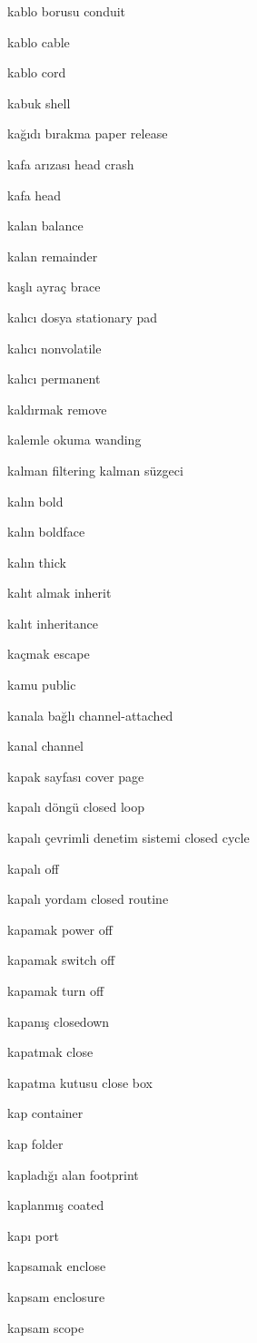\documentclass[12pt,fleqn]{article}\usepackage{../../common}
\begin{document}
kablo borusu conduit

kablo cable

kablo cord

kabuk shell

kağıdı bırakma paper release

kafa arızası head crash

kafa head

kalan balance

kalan remainder

kaşlı ayraç brace

kalıcı dosya stationary pad

kalıcı nonvolatile

kalıcı permanent

kaldırmak remove

kalemle okuma wanding

kalman filtering kalman süzgeci

kalın bold

kalın boldface

kalın thick

kalıt almak inherit

kalıt inheritance

kaçmak escape

kamu public

kanala bağlı channel-attached

kanal channel

kapak sayfası cover page

kapalı döngü closed loop

kapalı çevrimli denetim sistemi closed cycle

kapalı off

kapalı yordam closed routine

kapamak power off

kapamak switch off

kapamak turn off

kapanış closedown

kapatmak close

kapatma kutusu close box

kap container

kap folder

kapladığı alan footprint

kaplanmış coated

kapı port

kapsamak enclose

kapsam enclosure

kapsam scope
\end{document}
